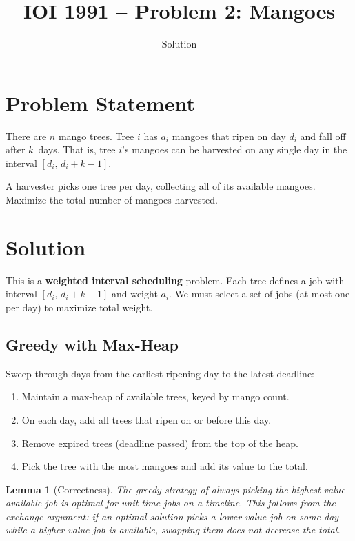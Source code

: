 \documentclass[11pt,a4paper]{article}
\title{IOI 1991 -- Problem 2: Mangoes}
\author{Solution}
\date{}
\newtheorem{lemma}[theorem]{Lemma}
\begin{document}
\maketitle

\section{Problem Statement}

There are $n$ mango trees. Tree $i$ has $a_i$ mangoes that ripen on day
$d_i$ and fall off after $k$~days. That is, tree $i$'s mangoes can be
harvested on any single day in the interval $[d_i,\, d_i + k - 1]$.

A harvester picks one tree per day, collecting all of its available mangoes.
Maximize the total number of mangoes harvested.

\section{Solution}

This is a \textbf{weighted interval scheduling} problem. Each tree defines
a job with interval $[d_i,\, d_i + k - 1]$ and weight $a_i$. We must
select a set of jobs (at most one per day) to maximize total weight.

\subsection{Greedy with Max-Heap}

Sweep through days from the earliest ripening day to the latest deadline:

\begin{enumerate}
  \item Maintain a max-heap of available trees, keyed by mango count.
  \item On each day, add all trees that ripen on or before this day.
  \item Remove expired trees (deadline passed) from the top of the heap.
  \item Pick the tree with the most mangoes and add its value to the total.
\end{enumerate}

\begin{lemma}[Correctness]
The greedy strategy of always picking the highest-value available job is
optimal for unit-time jobs on a timeline. This follows from the exchange
argument: if an optimal solution picks a lower-value job on some day while
a higher-value job is available, swapping them does not decrease the total.
\end{lemma}
\end{document}
